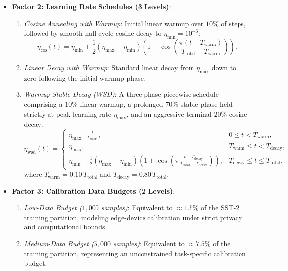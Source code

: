 \begin{itemize}
    \item \textbf{Factor 2: Learning Rate Schedules (3 Levels)}:
    \begin{enumerate}
        \item \emph{Cosine Annealing with Warmup}: Initial linear warmup over $10\%$ of steps, followed by smooth half-cycle cosine decay to $\eta_{\min} = 10^{-6}$:
        \begin{equation}
        \eta_{\text{cos}}(t) = \eta_{\min} + \frac{1}{2}(\eta_{\max} - \eta_{\min}) \left(1 + \cos\left(\frac{\pi (t - T_{\text{warm}})}{T_{\text{total}} - T_{\text{warm}}}\right)\right).
        \end{equation}
        \item \emph{Linear Decay with Warmup}: Standard linear decay from $\eta_{\max}$ down to zero following the initial warmup phase.
        \item \emph{Warmup-Stable-Decay (WSD)}: A three-phase piecewise schedule comprising a $10\%$ linear warmup, a prolonged $70\%$ stable phase held strictly at peak learning rate $\eta_{\max}$, and an aggressive terminal $20\%$ cosine decay:
        \begin{equation}
        \eta_{\text{wsd}}(t) = \begin{cases}
        \eta_{\max} \cdot \frac{t}{T_{\text{warm}}}, & 0 \le t < T_{\text{warm}}, \\
        \eta_{\max}, & T_{\text{warm}} \le t < T_{\text{decay}}, \\
        \eta_{\min} + \frac{1}{2}(\eta_{\max} - \eta_{\min}) \left(1 + \cos\left(\pi \frac{t - T_{\text{decay}}}{T_{\text{total}} - T_{\text{decay}}}\right)\right), & T_{\text{decay}} \le t \le T_{\text{total}},
        \end{cases}
        \label{eq:wsd_formula}
        \end{equation}
        where $T_{\text{warm}} = 0.10\, T_{\text{total}}$ and $T_{\text{decay}} = 0.80\, T_{\text{total}}$.
    \end{enumerate}
    
    \item \textbf{Factor 3: Calibration Data Budgets (2 Levels)}:
    \begin{enumerate}
        \item \emph{Low-Data Budget ($1{,}000$ samples)}: Equivalent to $\approx 1.5\%$ of the SST-2 training partition, modeling edge-device calibration under strict privacy and computational bounds.
        \item \emph{Medium-Data Budget ($5{,}000$ samples)}: Equivalent to $\approx 7.5\%$ of the training partition, representing an unconstrained task-specific calibration budget.
    \end{enumerate}
\end{itemize}

